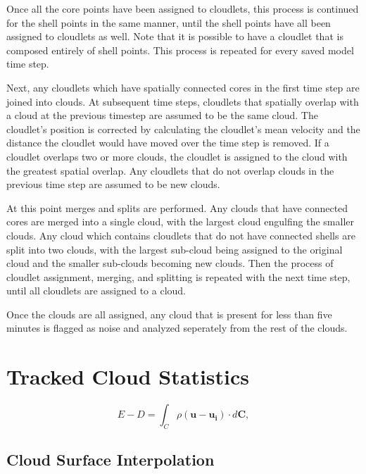 \documentclass[12pt]{article}
\begin{document}
Once all the core points have been assigned to cloudlets, this process is 
continued for the shell points in the same manner, until the shell points have 
all been assigned to cloudlets as well.  Note that it is possible to have a 
cloudlet that is composed entirely of shell points.  This process is repeated 
for every saved model time step.

Next, any cloudlets which have spatially connected cores in the first time step 
are joined into clouds.  At subsequent time steps, cloudlets that spatially 
overlap with a cloud at the previous timestep are assumed to be the same cloud.
The cloudlet's position is corrected by calculating the cloudlet's mean 
velocity and the distance the cloudlet would have moved over the time step is 
removed.  If a cloudlet overlaps two or more clouds, the cloudlet is assigned 
to the cloud with the greatest spatial overlap.  Any cloudlets that do not 
overlap clouds in the previous time step are assumed to be new clouds.

At this point merges and splits are performed.  Any clouds that have connected 
cores are merged into a single cloud, with the largest cloud engulfing the 
smaller clouds.  Any cloud which contains cloudlets that do not have connected
shells are split into two clouds, with the largest sub-cloud being assigned to 
the original cloud and the smaller sub-clouds becoming new clouds.  Then the 
process of cloudlet assignment, merging, and splitting is repeated with the 
next time step, until all cloudlets are assigned to a cloud.

Once the clouds are all assigned, any cloud that is present for less than 
five minutes is flagged as noise and analyzed seperately from the rest of 
the clouds.


\section{Tracked Cloud Statistics}


\begin{equation}
\label{eq:E_minus_D} 
E - D = \int_C \rho ( \mathbf{u} -  \mathbf{u_i}) \cdot d\mathbf{C},
\end{equation}

\subsection{Cloud Surface Interpolation}
\end{document}
